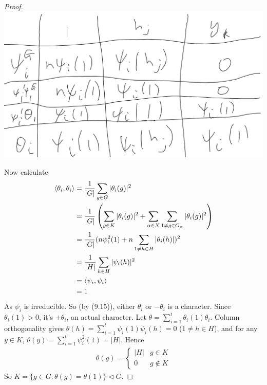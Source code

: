 \documentclass[a4paper]{article}
\begin{document}
\begin{thm}
\begin{proof}
\includegraphics[scale=0.5]{image/Rep_08.png}

Now calculate
\begin{equation*}
\begin{aligned}
\langle \theta_i ,\theta_i \rangle &= \frac{1}{|G|} \sum_{g \in G} |\theta_i(g)|^2\\
&= \frac{1}{|G|} \left(\sum_{g \in K} |\theta_i(g)|^2 + \sum_{\alpha \in X} \sum_{1 \neq g \in G_\alpha} |\theta_i(g)|^2\right)\\
&= \frac{1}{|G|} (n\psi_i^2 (1) + n \sum_{1 \neq h \in H} |\theta_i (h)|)^2\\
&= \frac{1}{|H|} \sum_{h \in H} |\psi_i(h)|^2\\
&= \langle \psi_i,\psi_i\rangle\\
&= 1
\end{aligned}
\end{equation*}
As $\psi_i$ is irreducible. So (by (9.15)), either $\theta_i$ or $-\theta_i$ is a character. Since $\theta_i(1) > 0$, it's $+\theta_i$, an actual character. Let $\theta = \sum_{i=1}^t \theta_i(1) \theta_i$. Column orthogonality gives $\theta(h) = \sum_{i=1}^t \psi_i(1) \psi_i(h) = 0$ ($1 \neq h \in H$), and for any $y \in K$, $\theta(y) = \sum_{i=1}^t \psi_i^2 (1) = |H|$. Hence
\begin{equation*}
\begin{aligned}
\theta(g) = \left\{\begin{array}{ll}
|H| & g \in K\\
0 & g \not\in K
\end{array}
\right.
\end{aligned}
\end{equation*}
So $K = \{g \in G : \theta(g) = \theta(1) \} \triangleleft G$.

\end{proof}
\end{thm}

\end{document}
